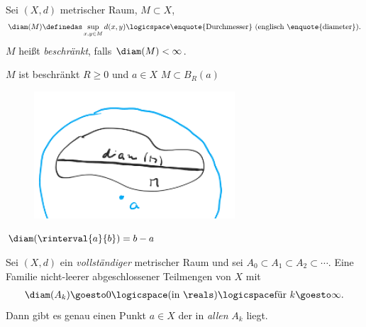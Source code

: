 \begin{definition}
    Sei \( (X,d)\) metrischer Raum, \( M\subset X\),
    \begin{align*}
        \diam(M)\definedas \sup_{x,y\in M}d(x,y)\logicspace \text{\enquote{Durchmesser} (englisch \enquote{diameter})}.
    \end{align*}
    \( M \) heißt \emph{beschränkt}, falls \( \diam(M)<\infty \).
\end{definition}
\begin{bemerkung*}
    \( M\) ist beschränkt \tiff \texists \( R\geq 0\)  und \( a\in X\) \sd \( M\subset B_R(a)\) 
    \begin{figure}[H]
        \centering
        \includegraphics[width=0.5\linewidth]{figures/beschraenkte_menge_in_ball}
        \label{fig:beschraenkte_menge_in_ball}
    \end{figure}   
\end{bemerkung*}
\begin{beispiel*}
    \( \diam(\rinterval{a}{b})=b-a\)
\end{beispiel*}
\begin{satz}[Schachtelungsprinzip]
    Sei \( (X,d)\) ein \emph{vollständiger} metrischer Raum und sei \( A_0\subset A_1\subset A_2\subset \cdots\).
    Eine Familie nicht-leerer abgeschlossener Teilmengen von \( X\) mit
    \begin{align*}
        \diam(A_k)\goesto 0 \logicspace (\text{in }\reals)\logicspace \text{für } k\goesto \infty. 
    \end{align*} 
    Dann gibt es genau einen Punkt \( a\in X\) der in \emph{allen} \( A_k\) liegt.
\end{satz}
